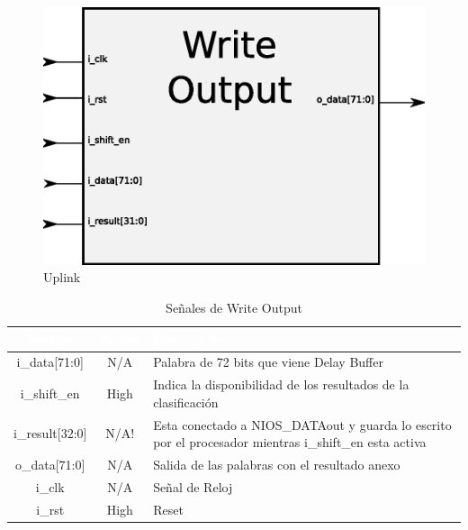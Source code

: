 \begin{figure}[H]
  \centering
	\includegraphics[scale=0.55]{3-arquitectura/graf/bloqwrite.eps}
  \caption{Uplink}
  \label{fig:bloquplink}
\end{figure}
	

\begin{table}
	\begin{tabular}{|c|c|p{9cm}|} \hline
\rowcolor[gray]{0.1} \textcolor{white}{Nombre} & \textcolor{white}{Activo} & \textcolor{white}{Descripción}\\ \hline
\rowcolor[gray]{0.75} i\_data[71:0]	& N/A & Palabra de 72 bits que viene Delay Buffer\\ \hline
\rowcolor[gray]{0.75} i\_shift\_en & High & Indica la disponibilidad de los resultados de la clasificación\\ \hline
\rowcolor[gray]{0.75} i\_result[32:0] & N/A! & Esta conectado a NIOS\_DATAout y guarda lo escrito por el procesador mientras i\_shift\_en esta activa \\ \hline
\rowcolor[gray]{0.9} o\_data[71:0] & N/A & Salida de las palabras con el resultado anexo\\ \hline
 i\_clk & N/A & Señal de Reloj\\ \hline
 i\_rst & High & Reset\\ \hline
	\end{tabular}
	\caption{Señales de Write Output}
	\label{tab:sigwo}
\end{table}


